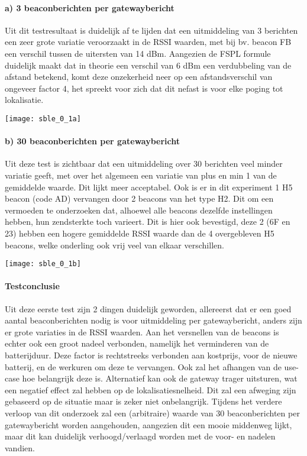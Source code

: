 \paragraph{a) 3 beaconberichten per gatewaybericht}
Uit dit testresultaat is duidelijk af te lijden dat een uitmiddeling van 3 berichten een zeer grote variatie veroorzaakt in de RSSI waarden, met bij bv. beacon FB een verschil tussen de uitersten van 14 dBm. Aangezien de FSPL formule duidelijk maakt dat in theorie een verschil van 6 dBm een verdubbeling van de afstand betekend, komt deze onzekerheid neer op een afstandsverschil van ongeveer factor 4, het spreekt voor zich dat dit nefast is voor elke poging tot lokalisatie.

\texttt{[image: sble\_0\_1a]}

\paragraph{b) 30 beaconberichten per gatewaybericht}
Uit deze test is zichtbaar dat een uitmiddeling over 30 berichten veel minder variatie geeft, met over het algemeen een variatie van plus en min 1 van de gemiddelde waarde. Dit lijkt meer acceptabel. Ook is er in dit experiment 1 H5 beacon (code AD) vervangen door 2 beacons van het type H2. Dit om een vermoeden te onderzoeken dat, alhoewel alle beacons dezelfde instellingen hebben, hun zendsterkte toch varieert. Dit is hier ook bevestigd, deze 2 (6F en 23) hebben een hogere gemiddelde RSSI waarde dan de 4 overgebleven H5 beacons, welke onderling ook vrij veel van elkaar verschillen.

\texttt{[image: sble\_0\_1b]}

\paragraph{Testconclusie}
Uit deze eerste test zijn 2 dingen duidelijk geworden, allereerst dat er een goed aantal beaconberichten nodig is voor uitmiddeling per gatewaybericht, anders zijn er grote variaties in de RSSI waarden. Aan het versnellen van de beacons is echter ook een groot nadeel verbonden, namelijk het verminderen van de batterijduur. Deze factor is rechtstreeks verbonden aan kostprijs, voor de nieuwe batterij, en de werkuren om deze te vervangen. Ook zal het afhangen van de use-case hoe belangrijk deze is. Alternatief kan ook de gateway trager uitsturen, wat een negatief effect zal hebben op de lokalisatiesnelheid. Dit zal een afweging zijn gebaseerd op de situatie maar is zeker niet onbelangrijk. Tijdens het verdere verloop van dit onderzoek zal een (arbitraire) waarde van 30 beaconberichten per gatewaybericht worden aangehouden, aangezien dit een mooie middenweg lijkt, maar dit kan duidelijk verhoogd/verlaagd worden met de voor- en nadelen vandien.

